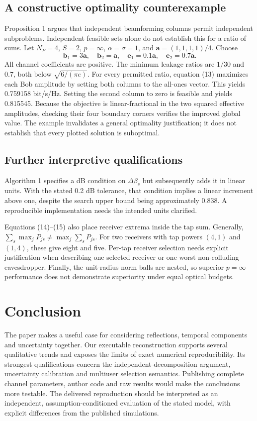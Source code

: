 \documentclass[conference]{IEEEtran}
\begin{document}
\subsection{A constructive optimality counterexample}
Proposition 1 argues that independent beamforming columns permit independent subproblems. Independent feasible sets alone do not establish this for a ratio of sums. Let $N_F=4$, $S=2$, $p=\infty$, $\alpha=\sigma=1$, and $\mathbf a=(1,1,1,1)/4$. Choose
\begin{equation}
\mathbf b_1=3\mathbf a,\quad\mathbf b_2=\mathbf a,\quad
\mathbf e_1=0.1\mathbf a,\quad\mathbf e_2=0.7\mathbf a.
\end{equation}
All channel coefficients are positive. The minimum leakage ratios are $1/30$ and $0.7$, both below $\sqrt{6/(\pi e)}$. For every permitted ratio, equation (13) maximizes each Bob amplitude by setting both columns to the all-ones vector. This yields 0.759158 bit/s/Hz. Setting the second column to zero is feasible and yields 0.815545. Because the objective is linear-fractional in the two squared effective amplitudes, checking their four boundary corners verifies the improved global value. The example invalidates a general optimality justification; it does not establish that every plotted solution is suboptimal.

\subsection{Further interpretive qualifications}
Algorithm 1 specifies a dB condition on $\Delta\beta_s$ but subsequently adds it in linear units. With the stated 0.2 dB tolerance, that condition implies a linear increment above one, despite the search upper bound being approximately 0.838. A reproducible implementation needs the intended units clarified.

Equations (14)--(15) also place receiver extrema inside the tap sum. Generally, $\sum_s\max_j P_{js}\neq\max_j\sum_sP_{js}$. For two receivers with tap powers $(4,1)$ and $(1,4)$, these give eight and five. Per-tap receiver selection needs explicit justification when describing one selected receiver or one worst non-colluding eavesdropper. Finally, the unit-radius norm balls are nested, so superior $p=\infty$ performance does not demonstrate superiority under equal optical budgets.

\section{Conclusion}
The paper makes a useful case for considering reflections, temporal components and uncertainty together. Our executable reconstruction supports several qualitative trends and exposes the limits of exact numerical reproducibility. Its strongest qualifications concern the independent-decomposition argument, uncertainty calibration and multiuser selection semantics. Publishing complete channel parameters, author code and raw results would make the conclusions more testable. The delivered reproduction should be interpreted as an independent, assumption-conditioned evaluation of the stated model, with explicit differences from the published simulations.
\end{document}

